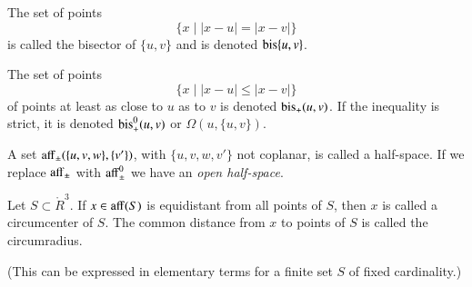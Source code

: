 \begin{tarskidata}
\begin{tarski}
\begin{definition}[bisector]
The set of points 
   $$
   \{ x \mid |x - u | = |x-v|\}
   $$
is called the bisector of $\{u,v\}$ and is denoted
${\operatorname{bis}}\{u,v\}$.
\end{definition}
\end{tarski}

\begin{tarski}

\begin{definition}[$\op{bis}_+$]
The set of points
   $$
   \{ x \mid |x- u | \le |x-v|\}
   $$
of points at least as close to $u$ as to $v$ is denoted
${\operatorname{bis}}_+(u,v)$.  If the inequality is strict, it is denoted
${\operatorname{bis}}_+^0(u,v)$ or $\Omega(u,\{u,v\})$.
\end{definition}
\end{tarski}

\begin{tarski}

\begin{definition}
A set ${\operatorname{aff}}_{\pm}(\{u,v,w\},\{v'\})$,
with $\{u,v,w,v'\}$ not coplanar, is called a half-space.  If
we replace ${\operatorname{aff}}_{\pm}$ with ${\operatorname{aff}}_{\pm}^0$ we have an
{\it open half-space}.
\end{definition}
\end{tarski}






\begin{tarski}

\begin{definition}
Let $S\subset\ring{R}^3$.  If
$x\in{\operatorname{aff}}(S)$ 
is equidistant from all  points of $S$, then $x$ is called a
circumcenter of $S$.  The common distance from $x$ to points
of $S$ is called the circumradius.
\end{definition}
\end{tarski}
(This can be expressed in elementary terms for a finite set $S$
of fixed cardinality.)


\end{tarskidata}
